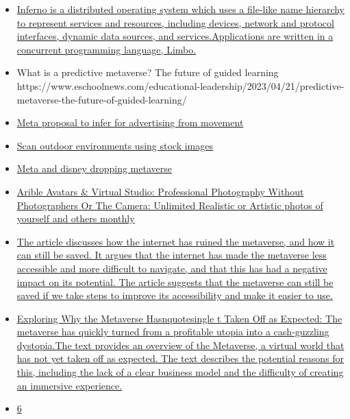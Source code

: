 \begin{itemize}
\item
  \href{https://github.com/inferno-os/inferno-os}{Inferno is a
  distributed operating system which uses a file-like name hierarchy to
  represent services and resources, including devices, network and
  protocol interfaces, dynamic data sources, and services.Applications
  are written in a concurrent programming language, Limbo.}
\item
  What is a predictive metaverse? The future of guided learning
  https://www.eschoolnews.com/educational-leadership/2023/04/21/predictive-metaverse-the-future-of-guided-learning/
\item
  \href{https://www.reddit.com/r/virtualreality/comments/12rro32/meta_ai_proposed_an_algorithmbased_arvr_body/}{Meta
  proposal to infer for advertising from movement}
\item
  \href{https://www.reddit.com/r/vfx/comments/12ok0xe/how_to_scan_environments_for_free_without_any/}{Scan
  outdoor environments using stock images}
\item
  \href{https://www.reddit.com/r/CryptoCurrency/comments/128hqkw/meta_microsoft_and_disney_are_reversing_their/}{Meta
  and disney dropping metaverse}
\item
  \href{https://www.arible.co/prompts}{Arible Avatars \& Virtual Studio:
  Professional Photography Without Photographers Or The Camera:
  Unlimited Realistic or Artistic photos of yourself and others monthly}
\item
  \href{https://www.wired.com/story/metaverse-ethics/}{The article
  discusses how the internet has ruined the metaverse, and how it can
  still be saved. It argues that the internet has made the metaverse
  less accessible and more difficult to navigate, and that this has had
  a negative impact on its potential. The article suggests that the
  metaverse can still be saved if we take steps to improve its
  accessibility and make it easier to use.}
\item
  \href{https://www.bbntimes.com/technology/exploring-why-the-metaverse-hasn-t-taken-off-as-expected}{Exploring
  Why the Metaverse Hasnquotesingle t Taken Off as Expected: The
  metaverse has quickly turned from a profitable utopia into a
  cash-guzzling dystopia.The text provides an overview of the Metaverse,
  a virtual world that has not yet taken off as expected. The text
  describes the potential reasons for this, including the lack of a
  clear business model and the difficulty of creating an immersive
  experience.}
\item
  \href{https://www.reddit.com/r/virtualreality/comments/12lpsvf/rumor_meta_quest_had_more_than_6_million_monthly/}{6
}
\end{itemize}
